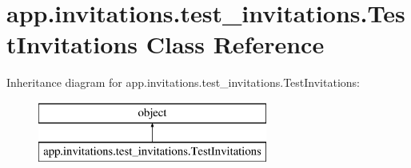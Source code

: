 \hypertarget{classapp_1_1invitations_1_1test__invitations_1_1_test_invitations}{}\section{app.\+invitations.\+test\+\_\+invitations.\+Test\+Invitations Class Reference}
\label{classapp_1_1invitations_1_1test__invitations_1_1_test_invitations}
Inheritance diagram for app.\+invitations.\+test\+\_\+invitations.\+Test\+Invitations\+:\begin{figure}[H]
\begin{center}
\leavevmode
\includegraphics[height=2.000000cm]{classapp_1_1invitations_1_1test__invitations_1_1_test_invitations}
\end{center}
\end{figure}
